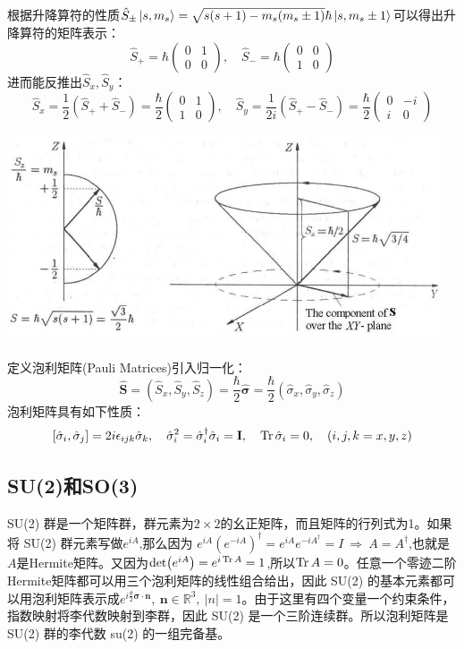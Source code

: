 根据升降算符的性质$\hat{S}_{\pm}\ket{s,m_s}=\sqrt{s(s+1)-m_s(m_s\pm1)}\hbar\ket{s,m_s\pm1}$可以得出升降算符的矩阵表示：
\[\hat{S}_+=\hbar\begin{pmatrix} 0 & 1 \\ 0 & 0 \end{pmatrix}, \quad \hat{S}_-=\hbar\begin{pmatrix} 0 & 0\\ 1 & 0 \end{pmatrix}\]
进而能反推出$\hat{S}_x,\hat{S}_y$：
\[\hat{S}_x=\frac{1}{2}(\hat{S}_++\hat{S}_-)=\frac{\hbar}{2}\begin{pmatrix} 0 & 1 \\ 1 & 0 \end{pmatrix}, \quad \hat{S}_y=\frac{1}{2i}(\hat{S}_+-\hat{S}_-)=\frac{\hbar}{2}\begin{pmatrix} 0 & -i \\ i & 0 \end{pmatrix}\]

\begin{center}
    \includegraphics[scale=0.7]{fig/lzhx/微信图片_20211028113518}
\end{center}

定义泡利矩阵(Pauli Matrices)引入归一化：
\[\hat{\bm{S}}=(\hat{S}_x,\hat{S}_y,\hat{S}_z)=\frac{\hbar}{2}\hat{\bm{\sigma}}=\frac{\hbar}{2}(\hat{\sigma}_x,\hat{\sigma}_y,\hat{\sigma}_z)\]
泡利矩阵具有如下性质：
\[[\hat{\sigma}_i,\hat{\sigma}_j]=2i\epsilon_{ijk}\hat{\sigma}_k, \quad \hat{\sigma}_i^2=\hat{\sigma}_i^{\dagger}\hat{\sigma}_i=\mathbf{I}, \quad \Tr\hat{\sigma}_i=0, \quad (i,j,k=x,y,z)\]

\subsection{SU(2)和SO(3)}
SU(2) 群是一个矩阵群，群元素为$2\times2$的幺正矩阵，而且矩阵的行列式为1。如果将 SU(2) 群元素写做$e^{iA}$,那么因为 $e^{iA}(e^{-iA})^\dagger=e^{iA}e^{-iA^\dagger}=I \ \Rightarrow \ A=A^\dagger$,也就是$A$是Hermite矩阵。又因为$\det(e^{iA})=e^{i\Tr A}=1$,所以$\Tr A=0$。任意一个零迹二阶Hermite矩阵都可以用三个泡利矩阵的线性组合给出，因此 SU(2) 的基本元素都可以用泡利矩阵表示成$e^{i\frac{\theta}{2}\bm{\sigma}\cdot\bm{n}}, \ \bm{n}\in\mathbb{R}^3, \ |n|=1$。由于这里有四个变量一个约束条件，指数映射将李代数映射到李群，因此 SU(2) 是一个三阶连续群。所以泡利矩阵是 SU(2) 群的李代数 su(2) 的一组完备基。

